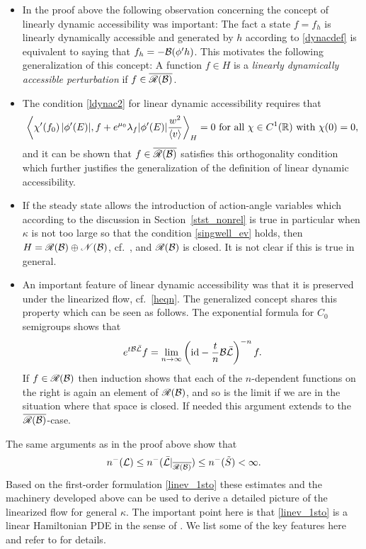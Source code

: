 \documentclass[11pt]{article}
\begin{document}
\begin{remark}
  \begin{itemize}
  \item[(a)]
    In the proof above the following observation concerning
    the concept of linearly dynamic accessibility was important:
    The fact a state $f=f_h$ is linearly dynamically accessible
    and generated by $h$ according to \eqref{dynacdef}
    is equivalent to saying that $f_h = -{\cal B} (\phi' h)$.
    This motivates the following generalization of this concept:
    A function $f\in H$ is a
    {\em linearly dynamically accessible perturbation}
    if $f\in \overline{{\mathscr R}(\mathcal B)}$.
  \item[(b)]
    The condition \eqref{ldynac2} for linear dynamic accessibility
    requires that
    \[
    \left\langle \chi'(f_0)\, |\phi'(E)|,
    f + e^{\mu_0}\lambda_f |\phi'(E)| \frac{w^2}{\left\langle v\right\rangle}
    \right\rangle_H =0
    \ \mbox{for all}\ \chi\in C^1(\mathbb R)\ \mbox{with}\ \chi(0)=0,
    \]
    and it can be shown that $f\in \overline{{\mathscr R}(\mathcal B)}$
    satisfies this orthogonality condition which further justifies the
    generalization of the definition of linear dynamic accessibility.
  \item[(c)]
    If the steady state allows the introduction of action-angle
    variables which according to the discussion in Section~\ref{stst_nonrel}
    is true in particular when $\kappa$ is not too large so that
    the condition \eqref{singwell_ev} holds, then
    $H={\mathscr R}({\cal B}) \oplus {\mathscr N}({\cal B})$, cf.~\cite[Prop.~5.9]{GueStrRe},
    and ${\mathscr R}({\cal B})$ is closed. It is not clear if this is true
    in general. 
  \item[(d)]
    An important feature of linear dynamic accessibility was that it is
    preserved under the linearized flow, cf.~\eqref{heqn}. The generalized
    concept shares this property which can be seen as follows. The exponential
    formula for $C_0$ semigroups \cite[Theorem~8.3]{Pazy} shows that
    \[
    e^{t {\cal B}\bar {{\cal L}}} f = \lim_{n\to\infty}
    \left(\mathrm{id}-\frac{t}{n}{\cal B}\bar{{\cal L}}\right)^{-n} f.
    \]
    If $f\in {\mathscr R}({\cal B})$ then induction shows that each of the $n$-dependent
    functions on the right is again an element of ${\mathscr R}({\cal B})$, and so is the
    limit if we are in the situation where that space is closed.
    If needed this argument extends to the $\overline{{\mathscr R}(\mathcal B)}$-case.
  \end{itemize}
\end{remark}
% 
The same arguments as in the proof above show that
\[
n^{-} ( \mathcal{L}) \leq
n^{-} ( \bar{\mathcal{L}}|_{\overline{{\mathscr R}(\mathcal{B})}})
\le n^{-} ( \tilde{S}) <\infty.
\]
Based on the first-order formulation \eqref{linev_1sto} these estimates
and the machinery developed above can be used to derive a detailed
picture of the linearized flow for general $\kappa$. The important point here
is that \eqref{linev_1sto} is a linear Hamiltonian PDE in the sense of
\cite{LinZeng2017}. We list some of the key features here and refer to
\cite[Theorem~4.28]{HaLinRe} for details.
\end{document}
